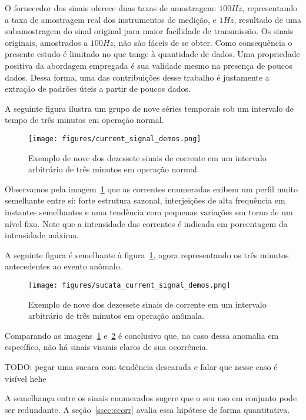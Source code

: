 O fornecedor dos sinais oferece duas taxas de amostragem: $100Hz$,
representando a taxa de amostragem real dos instrumentos de medição, e $1Hz$,
resultado de uma subamostragem do sinal original para maior facilidade de
transmissão. Os sinais originais, amostrados a $100Hz$, não são fáceis de se
obter. Como consequência o presente estudo é limitado no que tange à quantidade
de dados. Uma propriedade positiva da abordagem empregada é sua validade mesmo
na presença de poucos dados. Dessa forma, uma das contribuições desse trabalho
é justamente a extração de padrões úteis a partir de poucos dados.

A seguinte figura ilustra um grupo de nove séries temporais sob um intervalo
de tempo de três minutos em operação normal.

\begin{figure}[H]
    \centering
    \texttt{[image: figures/current\_signal\_demos.png]}
    \caption{Exemplo de nove dos dezessete sinais de corrente em um intervalo
    arbitrário de três minutos em operação normal.}
    \label{fig:demo}
\end{figure}

Observamos pela imagem~\ref{fig:demo} que as correntes enumeradas exibem um
perfil muito semelhante entre si: forte estrutura sazonal, interjeições de alta
frequência em instantes semelhantes e uma tendência com pequenas variações em
torno de um nível fixo. Note que a intensidade das correntes é indicada em
porcentagem da intensidade máxima.

A seguinte figura é semelhante à figura~\ref{fig:demo}, agora representando os
três minutos antecedentes ao evento anômalo.

\begin{figure}[H]
    \centering
    \texttt{[image: figures/sucata\_current\_signal\_demos.png]}
    \caption{Exemplo de nove dos dezessete sinais de corrente em um intervalo
    arbitrário de três minutos em operação anômala.}
    \label{fig:demo_anomalous}
\end{figure}

Comparando as imagens~\ref{fig:demo} e~\ref{fig:demo_anomalous} é conclusivo
que, no caso dessa anomalia em específico, não há sinais visuais claros de sua
ocorrência.

TODO: pegar uma sucara com tendência descarada e falar que nesse caso é visível
hehe

A semelhança entre os sinais enumerados  sugere que o seu uso em conjunto pode
ser redundante. A seção~\ref{ssec:ccorr} avalia essa hipótese de forma
quantitativa.

